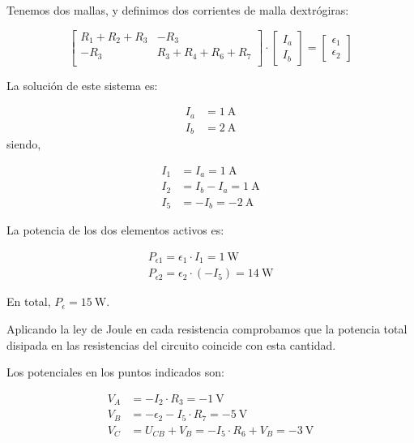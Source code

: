 Tenemos dos mallas, y definimos dos corrientes de malla dextrógiras:

\begin{equation*}
  \begin{bmatrix}
    R_1 + R_2 + R_3 & -R_3\\
    -R_3 & R_3 + R_4 + R_6 + R_7\\
  \end{bmatrix} \cdot %
  \begin{bmatrix}
    I_a\\
    I_b
  \end{bmatrix} = %
  \begin{bmatrix}
    \epsilon_1\\
    \epsilon_2
  \end{bmatrix}
\end{equation*}

La solución de este sistema es:

\begin{align*}
  I_a &= \qty{1}{\ampere}\\
  I_b &= \qty{2}{\ampere}
\end{align*}
siendo,

\begin{align*}
  I_1 &= I_a = \qty{1}{\ampere}\\
  I_2 &= I_b - I_a = \qty{1}{\ampere}\\
  I_5 &= -I_b = \qty{-2}{\ampere}
\end{align*}

La potencia de los dos elementos activos es:

\begin{align*}
  P_{\epsilon1} = \epsilon_1 \cdot I_1 = \qty{1}{\watt}\\
  P_{\epsilon2} = \epsilon_2 \cdot (-I_5) = \qty{14}{\watt}
\end{align*}

En total, $P_\epsilon = \qty{15}{\watt}$.

Aplicando la ley de Joule en cada resistencia comprobamos que la potencia total disipada en las resistencias del circuito coincide con esta cantidad.

Los potenciales en los puntos indicados son:

\begin{align*}
  V_A &= -I_2 \cdot R_3 = \qty{-1}{\volt}\\
  V_B &= -\epsilon_2 - I_5 \cdot R_7 = \qty{-5}{\volt}\\
  V_C &= U_{CB} + V_B = -I_5 \cdot R_6 + V_B = \qty{-3}{\volt}
\end{align*}

